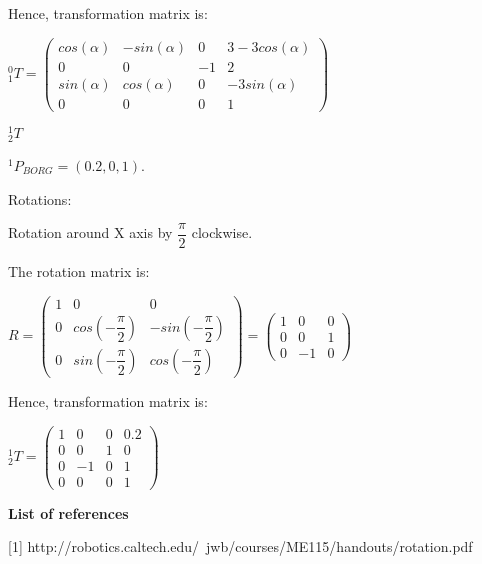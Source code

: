 \documentclass[12pt]{article}
\begin{document}
\begin{list}{)~}{}
Hence, transformation matrix is:

$_{1}^{0}T = \left(\begin{array}{cccc}
cos\left(\alpha\right) & -sin\left(\alpha\right) & 0 & 3-3cos\left(\alpha\right)\\
0 &  0  & -1 & 2\\
sin\left(\alpha\right) & cos\left(\alpha\right) & 0 & -3sin\left(\alpha\right)\\
0 & 0 & 0 & 1\end{array}\right)$

\newpage

\item
$_{2}^{1}T$

$^1 P_{BORG} = \left(0.2, 0, 1\right)$.

Rotations:

\begin{list}{)~}{}
\item Rotation around X axis by $\dfrac{\pi}{2}$ clockwise.

\end{list}

The rotation matrix is:

$R=
\left(\begin{array}{ccc}
1 & 0 & 0\\
0 & cos \left( - \dfrac{\pi}{2} \right) & -sin \left( - \dfrac{\pi}{2} \right) \\
0 & sin \left( - \dfrac{\pi}{2} \right) & cos \left(-\dfrac{\pi}{2} \right) \end{array}\right)
=
\left(\begin{array}{ccc}
1 & 0 & 0\\
0 & 0 & 1\\
0 & -1 & 0\end{array}\right)$

Hence, transformation matrix is:

$_{2}^{1}T = \left(\begin{array}{cccc}
1 & 0 & 0 & 0.2\\
0 & 0 & 1 & 0\\
0 & -1 & 0 & 1\\
0 & 0 & 0 & 1\end{array}\right)$

\end{list}

\medskip

\textbf{List of references}

[1] http://robotics.caltech.edu/~jwb/courses/ME115/handouts/rotation.pdf
\end{document}
